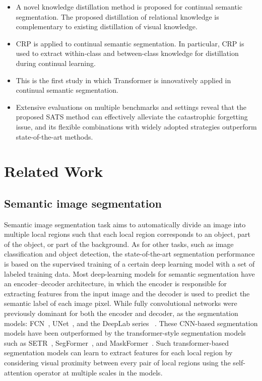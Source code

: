 \documentclass[onecolumn,conference,compsoc]{IEEEtran}
\begin{document}
\begin{spacing}{1.5}
\begin{itemize}
    \item A novel knowledge distillation {method is proposed} for continual semantic segmentation. The proposed distillation of relational knowledge is complementary to existing distillation of visual knowledge.
    \item CRP {is applied} to continual semantic segmentation. In particular, CRP is used to extract within-class and between-class knowledge for distillation during continual learning.
    \item This is the first study {in which Transformer is innovatively applied} in continual semantic segmentation.
    \item Extensive evaluations on multiple benchmarks and settings {reveal} that the proposed SATS method can effectively alleviate the catastrophic forgetting issue, and its flexible combinations with widely adopted strategies outperform state-of-the-art methods.
\end{itemize}




\section{Related Work}\label{sec:relatedwork}
\subsection{Semantic image segmentation}
{Semantic image segmentation task aims to automatically divide an image} into multiple local regions such that each local region corresponds to an object, part of the object, or part of the background. As for other tasks, {such as} image classification and object detection, the state-of-the-art segmentation performance is based on {the} supervised training of a certain deep learning model with a set of labeled training data. Most deep-learning models for semantic segmentation have an encoder–decoder architecture, {in which} the encoder is responsible for extracting features from the input image and the decoder is {used to predict} the semantic label of each image pixel. While fully convolutional networks were previously dominant for both the encoder and decoder, as the segmentation models: FCN~\cite{FCN}, UNet~\cite{UNet}, and the DeepLab series ~\cite{DeeplabV1, DeeplabV2, DeeplabV3, DeeplabV3+}. These CNN-based segmentation models have been outperformed by the transformer-style segmentation models such as SETR~\cite{SETR}, SegFormer~\cite{SegFormer}, and MaskFormer~\cite{MaskFormer}. Such transformer-based segmentation models can learn to extract features for each local region by considering visual proximity between every pair of local regions {using} the self-attention operator at multiple scales in the models.


\end{spacing}
\end{document}
